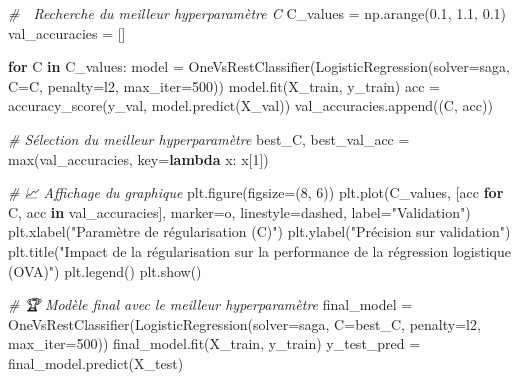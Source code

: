 \documentclass[
  letterpaper,
  DIV=11,
  numbers=noendperiod]{scrartcl}
\newenvironment{Shaded}{}{}
\newcommand{\BuiltInTok}[1]{\textcolor[rgb]{0.00,0.50,0.00}{#1}}
\newcommand{\CommentTok}[1]{\textcolor[rgb]{0.38,0.63,0.69}{\textit{#1}}}
\newcommand{\ControlFlowTok}[1]{\textcolor[rgb]{0.00,0.44,0.13}{\textbf{#1}}}
\newcommand{\DecValTok}[1]{\textcolor[rgb]{0.25,0.63,0.44}{#1}}
\newcommand{\FloatTok}[1]{\textcolor[rgb]{0.25,0.63,0.44}{#1}}
\newcommand{\KeywordTok}[1]{\textcolor[rgb]{0.00,0.44,0.13}{\textbf{#1}}}
\newcommand{\NormalTok}[1]{#1}
\newcommand{\OperatorTok}[1]{\textcolor[rgb]{0.40,0.40,0.40}{#1}}
\newcommand{\StringTok}[1]{\textcolor[rgb]{0.25,0.44,0.63}{#1}}
\begin{document}
\begin{Shaded}
\begin{Highlighting}[]
\CommentTok{\# 🎯 Recherche du meilleur hyperparamètre C}
\NormalTok{C\_values }\OperatorTok{=}\NormalTok{ np.arange(}\FloatTok{0.1}\NormalTok{, }\FloatTok{1.1}\NormalTok{, }\FloatTok{0.1}\NormalTok{)}
\NormalTok{val\_accuracies }\OperatorTok{=}\NormalTok{ []}

\ControlFlowTok{for}\NormalTok{ C }\KeywordTok{in}\NormalTok{ C\_values:}
\NormalTok{    model }\OperatorTok{=}\NormalTok{ OneVsRestClassifier(LogisticRegression(solver}\OperatorTok{=}\StringTok{\textquotesingle{}saga\textquotesingle{}}\NormalTok{, C}\OperatorTok{=}\NormalTok{C, penalty}\OperatorTok{=}\StringTok{\textquotesingle{}l2\textquotesingle{}}\NormalTok{, max\_iter}\OperatorTok{=}\DecValTok{500}\NormalTok{))}
\NormalTok{    model.fit(X\_train, y\_train)}
\NormalTok{    acc }\OperatorTok{=}\NormalTok{ accuracy\_score(y\_val, model.predict(X\_val))}
\NormalTok{    val\_accuracies.append((C, acc))}

\CommentTok{\# Sélection du meilleur hyperparamètre}
\NormalTok{best\_C, best\_val\_acc }\OperatorTok{=} \BuiltInTok{max}\NormalTok{(val\_accuracies, key}\OperatorTok{=}\KeywordTok{lambda}\NormalTok{ x: x[}\DecValTok{1}\NormalTok{])}


\CommentTok{\# 📈 Affichage du graphique}
\NormalTok{plt.figure(figsize}\OperatorTok{=}\NormalTok{(}\DecValTok{8}\NormalTok{, }\DecValTok{6}\NormalTok{))}
\NormalTok{plt.plot(C\_values, [acc }\ControlFlowTok{for}\NormalTok{ C, acc }\KeywordTok{in}\NormalTok{ val\_accuracies], marker}\OperatorTok{=}\StringTok{\textquotesingle{}o\textquotesingle{}}\NormalTok{, linestyle}\OperatorTok{=}\StringTok{\textquotesingle{}dashed\textquotesingle{}}\NormalTok{, label}\OperatorTok{=}\StringTok{"Validation"}\NormalTok{)}
\NormalTok{plt.xlabel(}\StringTok{"Paramètre de régularisation (C)"}\NormalTok{)}
\NormalTok{plt.ylabel(}\StringTok{"Précision sur validation"}\NormalTok{)}
\NormalTok{plt.title(}\StringTok{"Impact de la régularisation sur la performance de la régression logistique (OVA)"}\NormalTok{)}
\NormalTok{plt.legend()}
\NormalTok{plt.show()}

\CommentTok{\# 🏆 Modèle final avec le meilleur hyperparamètre}
\NormalTok{final\_model }\OperatorTok{=}\NormalTok{ OneVsRestClassifier(LogisticRegression(solver}\OperatorTok{=}\StringTok{\textquotesingle{}saga\textquotesingle{}}\NormalTok{, C}\OperatorTok{=}\NormalTok{best\_C, penalty}\OperatorTok{=}\StringTok{\textquotesingle{}l2\textquotesingle{}}\NormalTok{, max\_iter}\OperatorTok{=}\DecValTok{500}\NormalTok{))}
\NormalTok{final\_model.fit(X\_train, y\_train)}
\NormalTok{y\_test\_pred }\OperatorTok{=}\NormalTok{ final\_model.predict(X\_test)}


\end{Highlighting}
\end{Shaded}
\end{document}
